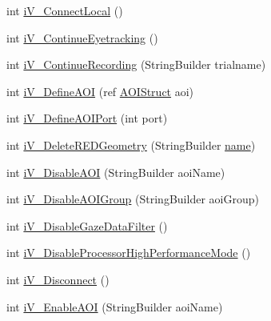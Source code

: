 \begin{DoxyCompactItemize}
\item 
int \hyperlink{class_web_analyzer_1_1_eye_tracking_1_1_eye_tracking_controller_ae1790b847e4c73c0e7ddb5e6f8361255}{i\+V\+\_\+\+Connect\+Local} ()
\item 
int \hyperlink{class_web_analyzer_1_1_eye_tracking_1_1_eye_tracking_controller_aa267c9c7db996b9f295ba0ecaaa285a3}{i\+V\+\_\+\+Continue\+Eyetracking} ()
\item 
int \hyperlink{class_web_analyzer_1_1_eye_tracking_1_1_eye_tracking_controller_a00511d2099b9c1b0f9788972674b7492}{i\+V\+\_\+\+Continue\+Recording} (String\+Builder trialname)
\item 
int \hyperlink{class_web_analyzer_1_1_eye_tracking_1_1_eye_tracking_controller_a87576506f1f0bca2d1d2f77bd0c59c30}{i\+V\+\_\+\+Define\+A\+O\+I} (ref \hyperlink{struct_web_analyzer_1_1_eye_tracking_1_1_eye_tracking_controller_1_1_a_o_i_struct}{A\+O\+I\+Struct} aoi)
\item 
int \hyperlink{class_web_analyzer_1_1_eye_tracking_1_1_eye_tracking_controller_aaf9a3e8173c45caca4767719ddf34a10}{i\+V\+\_\+\+Define\+A\+O\+I\+Port} (int port)
\item 
int \hyperlink{class_web_analyzer_1_1_eye_tracking_1_1_eye_tracking_controller_a772fc6857e02e9282ee3bc09ecf783aa}{i\+V\+\_\+\+Delete\+R\+E\+D\+Geometry} (String\+Builder \hyperlink{_u_i_2_h_t_m_l_resources_2js_2src_2create__experiment_8js_adac2bcb4f01b574cbc63fe8ee2c56bf0}{name})
\item 
int \hyperlink{class_web_analyzer_1_1_eye_tracking_1_1_eye_tracking_controller_a7f2b1e404b390b353f7325e61b1af42b}{i\+V\+\_\+\+Disable\+A\+O\+I} (String\+Builder aoi\+Name)
\item 
int \hyperlink{class_web_analyzer_1_1_eye_tracking_1_1_eye_tracking_controller_a8cbc6a090ddfbf388cd6703d05335670}{i\+V\+\_\+\+Disable\+A\+O\+I\+Group} (String\+Builder aoi\+Group)
\item 
int \hyperlink{class_web_analyzer_1_1_eye_tracking_1_1_eye_tracking_controller_ae94e65c2097d306effd9d90040191e8e}{i\+V\+\_\+\+Disable\+Gaze\+Data\+Filter} ()
\item 
int \hyperlink{class_web_analyzer_1_1_eye_tracking_1_1_eye_tracking_controller_ab198dd5d0e99e94dffca8e5cc89b8e28}{i\+V\+\_\+\+Disable\+Processor\+High\+Performance\+Mode} ()
\item 
int \hyperlink{class_web_analyzer_1_1_eye_tracking_1_1_eye_tracking_controller_a4fc587029ac9b79c48700b35c619f733}{i\+V\+\_\+\+Disconnect} ()
\item 
int \hyperlink{class_web_analyzer_1_1_eye_tracking_1_1_eye_tracking_controller_a79b457d90723744da8c4ad544b9ef3cd}{i\+V\+\_\+\+Enable\+A\+O\+I} (String\+Builder aoi\+Name)

\end{DoxyCompactItemize}
